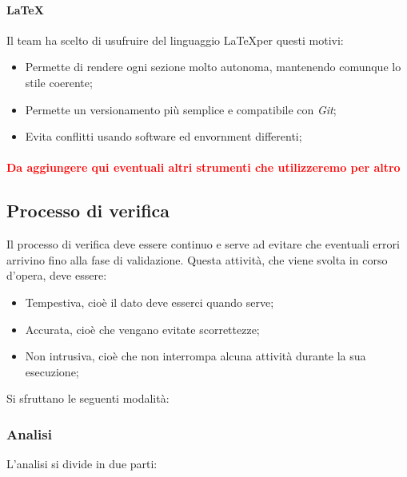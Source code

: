 \paragraph{\textbf{\LaTeX}}
Il team ha scelto di usufruire del linguaggio \LaTeX per questi motivi:
\begin{itemize}
	\item Permette di rendere ogni sezione molto autonoma, mantenendo comunque lo stile coerente;
	\item Permette un versionamento più semplice e compatibile con \emph{Git};
	\item Evita conflitti usando software ed envornment differenti;
\end{itemize}
\paragraph{\textcolor{red}{Da aggiungere qui eventuali altri strumenti che utilizzeremo per altro}}
\subsection{Processo di verifica}
Il processo di verifica deve essere continuo e serve ad evitare che eventuali errori arrivino fino alla fase di validazione.
Questa attività, che viene svolta in corso d'opera, deve essere:
\begin{itemize}
	\item Tempestiva, cioè il dato deve esserci quando serve;
	\item Accurata, cioè che vengano evitate scorrettezze;
	\item Non intrusiva, cioè che non interrompa alcuna attività durante la sua esecuzione;
\end{itemize}
Si sfruttano le seguenti modalità:
\subsubsection{Analisi}
L'analisi si divide in due parti:
